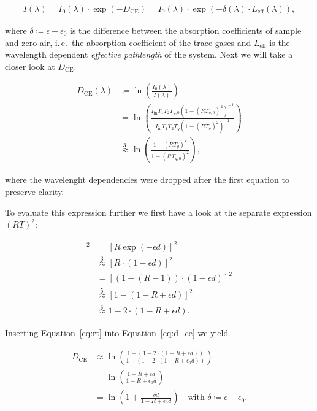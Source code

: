 \begin{align}
  I(\lambda) = I_0(\lambda) \cdot \exp(- D_{\text{CE}}) = I_0(\lambda)
  \cdot \exp(-\delta(\lambda) \cdot L_{\text{eff}}(\lambda)),
\end{align}

where $\delta \coloneqq \epsilon - \epsilon_0$ is the difference
between the absorption coefficients of sample and zero air, i.\,e.\ the
absorption coefficient of the trace gases and $L_{\text{eff}}$ is the
wavelength dependent \emph{effective pathlength} of the system. Next
we will take a closer look at $D_{\text{CE}}$.

\begin{align}
  D_{\text{CE}}(\lambda) & \coloneqq \ln\left(
                           \frac{I_0(\lambda)}{I(\lambda)}\right)\nonumber\\
                         & = \ln\left ( \frac{I_{\text{in}}T_1T_2T_{g,0}(1 -
                           (RT_{g,0})^2)^{-1}}{I_{\text{in}}T_1T_2T_g(1 -
                           (RT_g)^2)^{-1}}\right)\nonumber\\
                         & \stackrel{3.}{\approx} \ln\left( \frac{1 -
                           (RT_g)^2}{1 - (RT_{g,0})^2}\right)\label{eq:d_ce},
\end{align}

where the wavelenght dependencies were dropped after the first
equation to preserve clarity. 

To evaluate this expression further we
first have a look at the separate expression $(RT)^2$:

\begin{align}
  [RT]^2 & = [R \exp(-\epsilon d)]^2 \nonumber\\
         & \stackrel{3.}{\approx} [R \cdot(1 - \epsilon d)]^2 \nonumber\\
         & = [(1 + (R - 1))\cdot (1 - \epsilon d)]^2 \nonumber\\
         & \stackrel{5.}{\approx} [1 - (1 - R + \epsilon d)]^2 \nonumber\\
         & \stackrel{4.}{\approx} 1 - 2 \cdot (1 - R + \epsilon d)\label{eq:rt}.
\end{align}

Inserting Equation~\eqref{eq:rt} into Equation~\eqref{eq:d_ce} we
yield

\begin{align}
  D_{\text{CE}} & \approx \ln \left ( \frac{1 - (1 - 2\cdot ( 1- R +
  \epsilon d))}{1 - (1 - 2 \cdot (1 - R + \epsilon_0 d))}\right)\\
  & = \ln \left ( \frac{1 - R + \epsilon d}{1 - R + \epsilon_0
    d}\right) \\
  & = \ln \left ( 1 + \frac{ \delta d}{1 - R + \epsilon_0 d}\right) \quad
    \text{with } \delta \coloneqq \epsilon - \epsilon_0.
\end{align}

